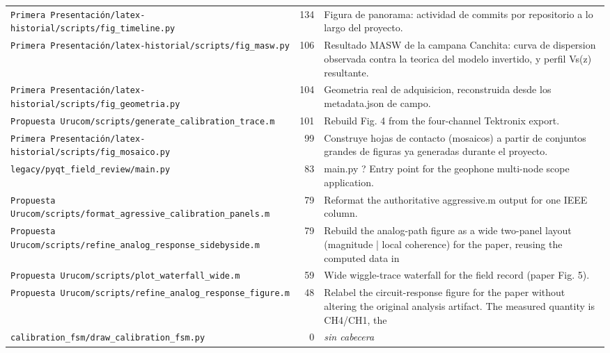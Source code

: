 \begin{longtable}{@{}p{5.4cm} r p{8.6cm}@{}}
\texttt{\scriptsize Primera Presentación/latex-historial/scripts/fig\_timeline.py} & 134 & Figura de panorama: actividad de commits por repositorio a lo largo del proyecto. \\
\texttt{\scriptsize Primera Presentación/latex-historial/scripts/fig\_masw.py} & 106 & Resultado MASW de la campana Canchita: curva de dispersion observada contra la teorica del modelo invertido, y perfil Vs(z) resultante. \\
\texttt{\scriptsize Primera Presentación/latex-historial/scripts/fig\_geometria.py} & 104 & Geometria real de adquisicion, reconstruida desde los metadata.json de campo. \\
\texttt{\scriptsize Propuesta Urucom/scripts/generate\_calibration\_trace.m} & 101 & Rebuild Fig. 4 from the four-channel Tektronix export. \\
\texttt{\scriptsize Primera Presentación/latex-historial/scripts/fig\_mosaico.py} & 99 & Construye hojas de contacto (mosaicos) a partir de conjuntos grandes de figuras ya generadas durante el proyecto. \\
\texttt{\scriptsize legacy/pyqt\_field\_review/main.py} & 83 & main.py ? Entry point for the geophone multi-node scope application. \\
\texttt{\scriptsize Propuesta Urucom/scripts/format\_agressive\_calibration\_panels.m} & 79 & Reformat the authoritative aggressive.m output for one IEEE column. \\
\texttt{\scriptsize Propuesta Urucom/scripts/refine\_analog\_response\_sidebyside.m} & 79 & Rebuild the analog-path figure as a wide two-panel layout (magnitude | local coherence) for the paper, reusing the computed data in \\
\texttt{\scriptsize Propuesta Urucom/scripts/plot\_waterfall\_wide.m} & 59 & Wide wiggle-trace waterfall for the field record (paper Fig. 5). \\
\texttt{\scriptsize Propuesta Urucom/scripts/refine\_analog\_response\_figure.m} & 48 & Relabel the circuit-response figure for the paper without altering the original analysis artifact. The measured quantity is CH4/CH1, the \\
\texttt{\scriptsize calibration\_fsm/draw\_calibration\_fsm.py} & 0 & \textit{sin cabecera} \\
\end{longtable}
\normalsize

